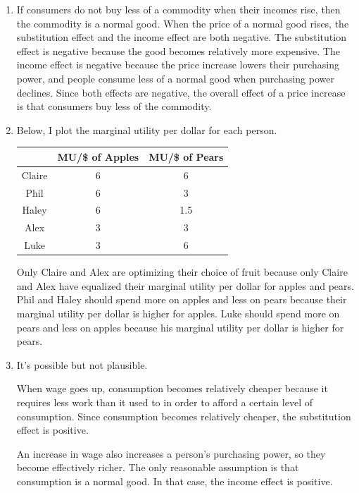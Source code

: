 \documentclass{article}
\begin{document}
\begin{enumerate}
\item If consumers do not buy less of a commodity when their incomes rise, then the commodity is a normal good. When the price of a normal good rises, the substitution effect and the income effect are both negative. The substitution effect is negative because the good becomes relatively more expensive. The income effect is negative because the price increase lowers their purchasing power, and people consume less of a normal good when purchasing power declines. Since both effects are negative, the overall effect of a price increase is that consumers buy less of the commodity.

\item Below, I plot the marginal utility per dollar for each person.

		\begin{center}
		\begin{tabular}{| c | c | c |}
		\hline
		& \makecell{MU/\$ of\\Apples} & \makecell{MU/\$ of\\Pears} \\
		\hline
		Claire & 6 & 6 \\
		\hline
		Phil & 6 & 3 \\
		\hline
		Haley & 6 & 1.5 \\
		\hline
		Alex & 3 & 3 \\
		\hline
		Luke & 3 & 6 \\
		\hline
		\end{tabular}
		\end{center}
		
	Only Claire and Alex are optimizing their choice of fruit because only Claire and Alex have equalized their marginal utility per dollar for apples and pears. Phil and Haley should spend more on apples and less on pears because their marginal utility per dollar is higher for apples. Luke should spend more on pears and less on apples because his marginal utility per dollar is higher for pears.

\item It's possible but not plausible.

When wage goes up, consumption becomes relatively cheaper because it requires less work than it used to in order to afford a certain level of consumption. Since consumption becomes relatively cheaper, the substitution effect is positive.

An increase in wage also increases a person's purchasing power, so they become effectively richer. The only reasonable assumption is that consumption is a normal good. In that case, the income effect is positive.


\end{enumerate}
\end{document}
